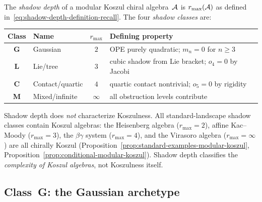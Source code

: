 \begin{definition}
\label{def:shadow-depth-holographic}
The \emph{shadow depth} of a modular Koszul chiral
algebra~$\mathcal{A}$ is $r_{\max}(\mathcal{A})$ as defined
in~\eqref{eq:shadow-depth-definition-recall}.
The four \emph{shadow classes} are:
\begin{center}
\renewcommand{\arraystretch}{1.4}
\begin{tabular}{clcl}
\toprule
Class & Name & $r_{\max}$ & Defining property \\
\midrule
\textbf{G} & Gaussian & $2$
 & OPE purely quadratic; $m_n = 0$ for $n \geq 3$ \\
\textbf{L} & Lie/tree & $3$
 & cubic shadow from Lie bracket; $o_4 = 0$ by Jacobi \\
\textbf{C} & Contact/quartic & $4$
 & quartic contact nontrivial; $o_5 = 0$ by rigidity \\
\textbf{M} & Mixed/infinite & $\infty$
 & all obstruction levels contribute \\
\bottomrule
\end{tabular}
\end{center}
\end{definition}

\begin{remark}
\label{rem:depth-vs-koszulness}
Shadow depth does \emph{not} characterize Koszulness.
All standard-landscape shadow classes contain Koszul algebras: the
Heisenberg algebra ($r_{\max} = 2$), affine Kac--Moody
($r_{\max} = 3$), the $\beta\gamma$ system
($r_{\max} = 4$), and the Virasoro algebra
($r_{\max} = \infty$) are all chirally Koszul
(Proposition~\ref{prop:standard-examples-modular-koszul},
Proposition~\ref{prop:conditional-modular-koszul}).
Shadow depth classifies the \emph{complexity of Koszul
algebras}, not Koszulness itself.
\end{remark}


\subsection{Class~G: the Gaussian archetype}
\label{subsec:class-g-gaussian}

